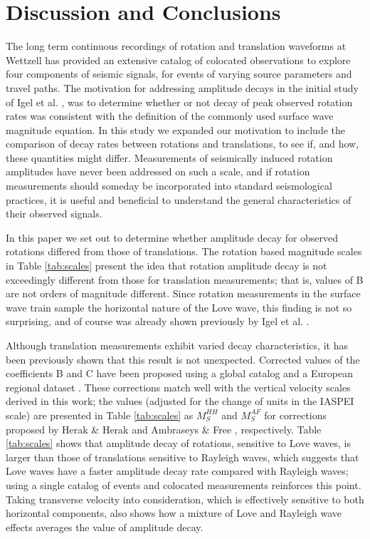 \documentclass{gji}
\begin{document}


\section{Discussion and Conclusions}
The long term continuous recordings of rotation and translation waveforms at Wettzell has provided an extensive catalog of colocated observations to explore four components of seismic signals, for events of varying source parameters and travel paths. The motivation for addressing amplitude decays in the initial study of Igel et al. , was to determine whether or not decay of peak observed rotation rates was consistent with the definition of the commonly used surface wave magnitude equation. In this study we expanded our motivation to include the comparison of decay rates between rotations and translations, to see if, and how, these quantities might differ. Measurements of seismically induced rotation amplitudes have never been addressed on such a scale, and  if rotation measurements should someday be incorporated into standard seismological practices, it is useful and beneficial to understand the general characteristics of their observed signals.

In this paper we set out to determine whether amplitude decay for observed rotations differed from those of translations. The rotation based magnitude scales in Table \ref{tab:scales} present the idea that rotation amplitude decay is not exceedingly different from those for translation measurements; that is, values of B are not orders of magnitude different. Since rotation measurements in the surface wave train sample the horizontal nature of the Love wave, this finding is not so surprising, and of course was already shown previously by Igel et al. .

Although translation measurements exhibit varied decay characteristics, it has been previously shown that this result is not unexpected. Corrected values of the coefficients B and C have been proposed using a global catalog \cite{herak1993distance} and a European regional dataset \cite{ambraseys1997surface}. These corrections match well with the vertical velocity scales derived in this work; the values (adjusted for the change of units in the IASPEI scale) are presented in Table \ref{tab:scales} as $M_S^{HH}$ and $M_S^{AF}$ for corrections proposed by Herak \& Herak  and Ambraseys \& Free , respectively. Table \ref{tab:scales} shows that amplitude decay of rotations, sensitive to Love waves, is larger than those of translations sensitive to Rayleigh waves, which suggests that Love waves have a faster amplitude decay rate  compared with Rayleigh waves; using a single catalog of events and colocated measurements reinforces this point. Taking transverse velocity into consideration, which is effectively sensitive to both horizontal components, also shows how a mixture of Love and Rayleigh wave effects averages the value of amplitude decay.
\end{document}
